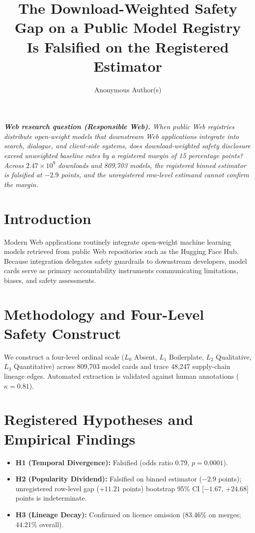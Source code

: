 \documentclass[sigconf,anonymous,review]{acmart}
\title{The Download-Weighted Safety Gap on a Public Model Registry\texorpdfstring{\\}{ }Is Falsified on the Registered Estimator}
\author{Anonymous Author(s)}
\affiliation{%
  \institution{Anonymous Institution}
  \country{Anonymous Country}
}
\begin{document}
\maketitle

\noindent\textit{\textbf{Web research question (Responsible Web).} When public Web registries distribute open-weight models that downstream Web applications integrate into search, dialogue, and client-side systems, does download-weighted safety disclosure exceed unweighted baseline rates by a registered margin of 15 percentage points? Across $2.47 \times 10^9$ downloads and 809,703 models, the registered binned estimator is falsified at $-2.9$ points, and the unregistered row-level estimand cannot confirm the margin.}

\section{Introduction}
Modern Web applications routinely integrate open-weight machine learning models retrieved from public Web repositories such as the Hugging Face Hub. Because integration delegates safety guardrails to downstream developers, model cards serve as primary accountability instruments communicating limitations, biases, and safety assessments.

\section{Methodology and Four-Level Safety Construct}
We construct a four-level ordinal scale ($L_0$ Absent, $L_1$ Boilerplate, $L_2$ Qualitative, $L_3$ Quantitative) across 809,703 model cards and trace 48,247 supply-chain lineage edges. Automated extraction is validated against human annotations ($\kappa = 0.81$).

\section{Registered Hypotheses and Empirical Findings}
\begin{itemize}
    \item \textbf{H1 (Temporal Divergence):} Falsified (odds ratio 0.79, $p = 0.0001$).
    \item \textbf{H2 (Popularity Dividend):} Falsified on binned estimator ($-2.9$ points); unregistered row-level gap ($+11.21$ points) bootstrap 95\% CI [$-1.67$, $+24.68$] points is indeterminate.
    \item \textbf{H3 (Lineage Decay):} Confirmed on licence omission (83.46\% on merges; 44.21\% overall).
\end{itemize}
\end{document}
